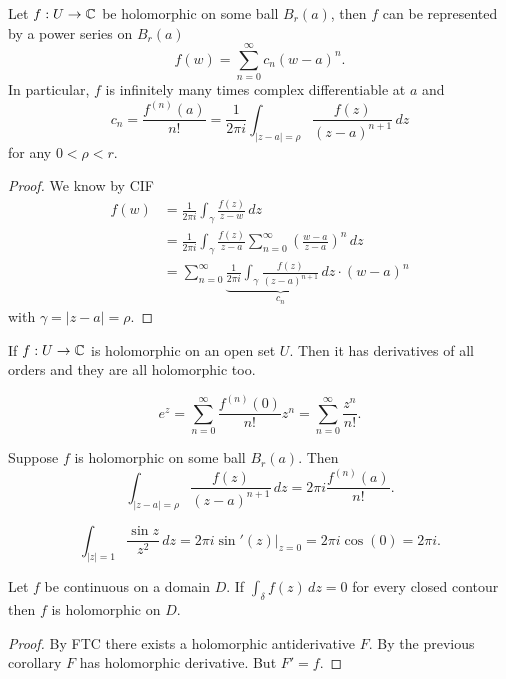 \documentclass[10pt, a4paper]{article}
\begin{document}
\begin{theorem}
    Let $f : U \to \mathbb{C}$ be holomorphic on some ball $B_r(a)$,
    then $f$ can be represented by a power series on $B_r(a)$
    \[
    f(w) = \sum_{n = 0}^{\infty}c_n(w - a) ^ n.
    \]
    In particular,
    $f$ is infinitely many times complex differentiable at $a$ and
    \[
    c_n = \frac{f ^ {(n)}(a)}{n!} = \frac{1}{2\pi i}\int_{|z - a| = \rho}\frac{f(z)}{(z - a) ^ {n + 1}}\,dz
    \]
    for any $0 < \rho < r$.

    \begin{proof}
        We know by CIF
        \begin{align*}
            f(w) &= \frac{1}{2\pi i}\int_{\gamma}\frac{f(z)}{z - w}\,dz \\
            &= \frac{1}{2\pi i}\int_{\gamma}\frac{f(z)}{z - a}\sum_{n = 0}^{\infty}\left(\frac{w - a}{z - a}\right) ^ n\,dz \\
            &= \sum_{n = 0}^{\infty}\underbrace{\frac{1}{2\pi i}\int_{\gamma}\frac{f(z)}{(z - a) ^ {n + 1}}\,dz}_{c_n}\cdot (w - a) ^ n
        \end{align*}
        with $\gamma = |z - a| = \rho$.
    \end{proof}
\end{theorem}

\begin{corollary}
    If $f : U \to \mathbb{C}$ is holomorphic on an open set $U$.
    Then it has derivatives of all orders and they are all holomorphic too.
\end{corollary}

\begin{example}
    \[
    e ^ z = \sum_{n = 0}^{\infty}\frac{f ^ {(n)}(0)}{n!}z ^ n = \sum_{n = 0}^{\infty}\frac{z ^ n}{n!}.
    \]
\end{example}

\begin{corollary}
    Suppose $f$ is holomorphic on some ball $B_r(a)$.
    Then
    \[
    \int_{|z - a| = \rho}\frac{f(z)}{(z - a) ^ {n + 1}}\,dz = 2\pi i\frac{f ^ {(n)}(a)}{n!}.
    \]
\end{corollary}

\begin{example}
    \[
    \int_{|z| = 1}\frac{\sin{z}}{z ^ 2}\,dz = 2\pi i\sin'(z)\big|_{z = 0} = 2\pi i\cos(0) = 2\pi i.
    \]
\end{example}

\begin{theorem}
    Let $f$ be continuous on a domain $D$.
    If $\int_{\delta}f(z)\,dz = 0$ for every closed contour then $f$ is holomorphic on $D$.

    \begin{proof}
        By FTC there exists a holomorphic antiderivative $F$.
        By the previous corollary $F$ has holomorphic derivative.
        But $F' = f$.
    \end{proof}
\end{theorem}
\end{document}
